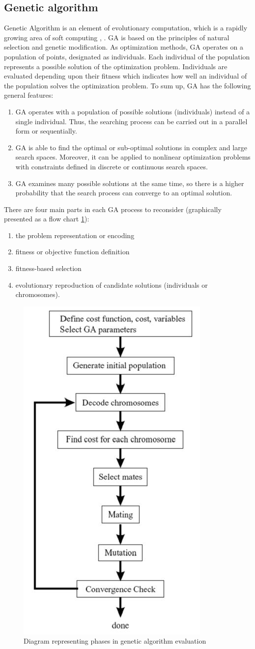 \subsection{Genetic algorithm}
\label{cha:Genetic_algorithm}
Genetic Algorithm is an element of evolutionary computation, which is a 
rapidly growing area of soft computing \cite{bib42}, \cite{bib43}. GA is based on the principles of
natural selection and genetic modification. As optimization methods, GA 
operates on a population of points, designated as individuals. Each 
individual of the population represents a possible solution of the 
optimization problem. Individuals are evaluated depending upon their 
fitness which indicates how well an individual of the population solves 
the optimization problem. To sum up, GA has the following general features:
\begin{enumerate}
    \item GA operates with a population of possible solutions (individuals) 
        instead of a single individual. Thus, the searching process can be 
        carried out in a parallel form or sequentially.
    \item GA is able to find the optimal or sub-optimal solutions in complex
        and large search spaces. Moreover, it can be applied to nonlinear 
        optimization problems with constraints defined in discrete or continuous 
        search spaces.
    \item GA examines many possible solutions at the same time, so there is a 
        higher probability that the search process can converge to an optimal solution.
\end{enumerate}
There are four main parts in each GA process to reconsider (graphically
presented as a flow chart \ref{fig:genetic_scheme}):
\begin{enumerate}
    \item the problem representation or encoding
    \item fitness or objective function definition
    \item fitness-based selection
    \item evolutionary reproduction of candidate solutions (individuals or chromosomes). 
\end{enumerate}
\begin{figure}[H]
    \begin{center}
        \includegraphics[height=0.5\textwidth]{fig/genetic.png}
    \end{center}
    \caption{Diagram representing phases in genetic algorithm evaluation}
    \label{fig:genetic_scheme}
\end{figure}

